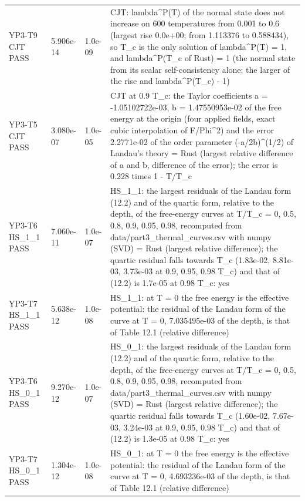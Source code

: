 \documentclass[aps,prd,onecolumn,superscriptaddress,nofootinbib,floatfix,longbibliography]{revtex4-2}
\begin{document}
\begin{longtable}{p{}p{}p{}p{}}
YP3-T9 CJT \newline PASS & 5.906e-14 & 1.0e-09 & CJT: lambda\textasciicircum{}P(T) of the normal state does not increase on 600 temperatures from 0.001 to 0.6 (largest rise 0.0e+00; from 1.113376 to 0.588434), so T\_c is the only solution of lambda\textasciicircum{}P(T) = 1, and lambda\textasciicircum{}P(T\_c of Rust) = 1 (the normal state from its scalar self-consistency alone; the larger of the rise and \textbar{}lambda\textasciicircum{}P(T\_c) - 1\textbar{}) \\
YP3-T5 CJT \newline PASS & 3.080e-07 & 1.0e-05 & CJT at 0.9 T\_c: the Taylor coefficients a = -1.05102722e-03, b = 1.47550953e-02 of the free energy at the origin (four applied fields, exact cubic interpolation of F/Phi\textasciicircum{}2) and the error 2.2771e-02 of the order parameter (-a/2b)\textasciicircum{}(1/2) of Landau's theory = Rust (largest relative difference of a and b, difference of the error); the error is 0.228 times 1 - T/T\_c \\
YP3-T6 HS\_1\_1 \newline PASS & 7.060e-11 & 1.0e-07 & HS\_1\_1: the largest residuals of the Landau form (12.2) and of the quartic form, relative to the depth, of the free-energy curves at T/T\_c = 0, 0.5, 0.8, 0.9, 0.95, 0.98, recomputed from data/part3\_thermal\_curves.csv with numpy (SVD) = Rust (largest relative difference); the quartic residual falls towards T\_c (1.83e-02, 8.81e-03, 3.73e-03 at 0.9, 0.95, 0.98 T\_c) and that of (12.2) is 1.7e-05 at 0.98 T\_c: yes \\
YP3-T7 HS\_1\_1 \newline PASS & 5.638e-12 & 1.0e-08 & HS\_1\_1: at T = 0 the free energy is the effective potential: the residual of the Landau form of the curve at T = 0, 7.035495e-03 of the depth, is that of Table 12.1 (relative difference) \\
YP3-T6 HS\_0\_1 \newline PASS & 9.270e-12 & 1.0e-07 & HS\_0\_1: the largest residuals of the Landau form (12.2) and of the quartic form, relative to the depth, of the free-energy curves at T/T\_c = 0, 0.5, 0.8, 0.9, 0.95, 0.98, recomputed from data/part3\_thermal\_curves.csv with numpy (SVD) = Rust (largest relative difference); the quartic residual falls towards T\_c (1.60e-02, 7.67e-03, 3.24e-03 at 0.9, 0.95, 0.98 T\_c) and that of (12.2) is 1.3e-05 at 0.98 T\_c: yes \\
YP3-T7 HS\_0\_1 \newline PASS & 1.304e-12 & 1.0e-08 & HS\_0\_1: at T = 0 the free energy is the effective potential: the residual of the Landau form of the curve at T = 0, 4.693236e-03 of the depth, is that of Table 12.1 (relative difference) \\

\end{longtable}
\end{document}
